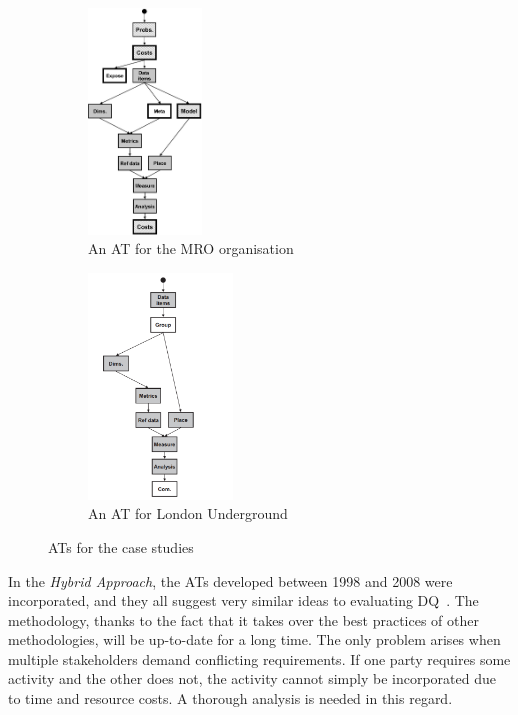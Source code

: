 \begin{figure}[htb]
    \centering
    
    \begin{subfigure}{0.45\textwidth}
        \includegraphics[height=6cm]{figures/hybrid-at-mro.jpg}
        \centering
        \caption{An AT for the MRO organisation}
        \label{fig:subim1}
    \end{subfigure}
    \begin{subfigure}{0.45\textwidth}
        \includegraphics[height=6cm]{figures/hybrid-at-lu.png}
        \centering
        \caption{An AT for London Underground}
        \label{fig:subim2}
    \end{subfigure}

    \caption{ATs for the case studies~\cite{woodal2013}}
    \label{fig:image2}
\end{figure}
\FloatBarrier

In the \textit{Hybrid Approach}, the ATs developed between 1998 and 2008 were incorporated, and they all suggest very similar ideas to evaluating DQ~\cite{woodal2013}.
The methodology, thanks to the fact that it takes over the best practices of other methodologies, will be up-to-date for a long time.
The only problem arises when multiple stakeholders demand conflicting requirements.
If one party requires some activity and the other does not, the activity cannot simply be incorporated due to time and resource costs.
A thorough analysis is needed in this regard.

